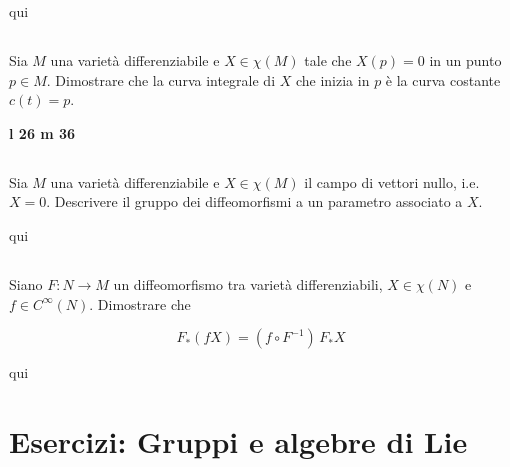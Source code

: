 qui

%

\newpage

%

\section{}\label{es2-32}

\begin{tcolorbox}
	Sia $ M $ una varietà differenziabile e $ X \in \chi(M) $ tale che $ X(p) = 0 $ in un punto $ p \in M $. Dimostrare che la curva integrale di $ X $ che inizia in $ p $ è la curva costante $ c(t)=p $.
\end{tcolorbox}

\textbf{l 26 m 36}

%

\newpage

%

\section{}\label{es2-33}

\begin{tcolorbox}
	Sia $ M $ una varietà differenziabile e $ X \in \chi(M) $ il campo di vettori nullo, i.e. $ X = 0 $. Descrivere il gruppo dei diffeomorfismi a un parametro associato a $ X $.
\end{tcolorbox}

qui

%

\newpage

%

\section{}\label{es2-34}

\begin{tcolorbox}
	Siano $ F : N \to M $ un diffeomorfismo tra varietà differenziabili, $ X \in \chi(N) $ e $ f \in C^{\infty}(N) $. Dimostrare che
	
	\begin{equation}
		F_{*}(f X) = (f \circ F^{-1}) \, F_{*} X
	\end{equation}
\end{tcolorbox}

qui

\chapter{Esercizi: Gruppi e algebre di Lie}

